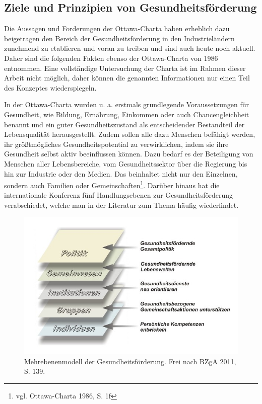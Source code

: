 \subsection{Ziele und Prinzipien von Gesundheitsförderung}
\label{sec:ZieleUndPrinzipienVonGesundheitsförderung}

Die Aussagen und Forderungen der Ottawa-Charta haben erheblich dazu beigetragen den Bereich der Gesundheitsförderung in den Industrieländern zunehmend zu etablieren und voran zu treiben und sind auch heute noch aktuell.  Daher sind die folgenden Fakten ebenso der Ottawa-Charta von 1986 entnommen. Eine vollständige Untersuchung der Charta ist im Rahmen dieser Arbeit nicht möglich, daher können die genannten Informationen nur einen Teil des Konzeptes wiederspiegeln.

In  der Ottawa-Charta wurden u. a. erstmals grundlegende Voraussetzungen für Gesundheit, wie Bildung, Ernährung, Einkommen oder auch Chancengleichheit benannt und ein guter Gesundheitszustand als entscheidender Bestandteil der Lebensqualität herausgestellt. Zudem sollen alle dazu Menschen befähigt werden, ihr größtmögliches Gesundheitspotential zu verwirklichen, indem sie ihre Gesundheit selbst aktiv beeinflussen können. Dazu bedarf es der Beteiligung von Menschen aller Lebensbereiche, vom Gesundheitssektor über die Regierung bis hin zur Industrie oder den Medien. Das beinhaltet nicht nur den Einzelnen, sondern auch Familien oder Gemeinschaften\footnote{vgl. Ottawa-Charta 1986, S. 1f}. Darüber hinaus hat die internationale Konferenz fünf Handlungsebenen zur Gesundheitsförderung verabschiedet, welche man in der Literatur zum Thema häufig wiederfindet.

\begin{figure}[h]
	\centering
		\includegraphics[scale=0.45]{mehrebenenmodell.jpg}
	\caption{Mehrebenenmodell der Gesundheitsförderung. Frei nach BZgA 2011, S. 139.}
	\label{fig:mehrebenenmodell}
\end{figure}

